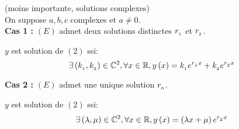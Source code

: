 \documentclass[12pt,twoside,a4paper]{article}
\begin{document}
			\begin{prop}
				(moins importante, solutions complexes)\\
				On suppose $a,b,c$ complexes et $a\neq0$.\\
				\textbf{Cas 1 :} $\left(E\right)$ admet deux solutions distinctes $r_{_{1}}$ et $r_{_{2}}$.
				\begin{tab}
					$y$ est solution de $\left(2\right)$ ssi:
					$$
						\exists\left(k_{_{1}},k_{_{2}}\right)\in\mathbb{C}^2,\forall x\in\mathbb{R},y\left(x\right)=k_{_{1}}e^{r_{_{1}}x}+k_{_{2}}e^{r_{_{2}}x}
					$$
				\end{tab}
				\textbf{Cas 2 :} $\left(E\right)$ admet une unique solution $r_{_{0}}$.
				\begin{tab}
					$y$ est solution de $\left(2\right)$ ssi:
					$$
						\exists\left(\lambda,\mu\right)\in\mathbb{C}^2,\forall x\in\mathbb{R},y\left(x\right)=\left(\lambda x+\mu\right)e^{r_{_{2}}x}
					$$
				\end{tab}
			\end{prop}
\end{document}
